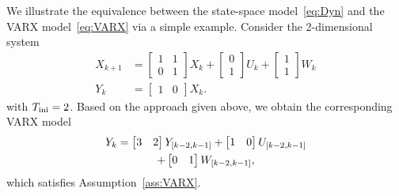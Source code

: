 \begin{exmp}
	We illustrate the equivalence between the state-space model~\eqref{eq:Dyn} and the VARX model~\eqref{eq:VARX} via a simple example. Consider the 2-dimensional system
	\begin{align*}
		X_{k+1} &= \begin{bmatrix} 1 & 1 \\ 0 & 1 \end{bmatrix} X_k+ \begin{bmatrix} 0 \\ 1\end{bmatrix} U_k+ \begin{bmatrix} 1\\1\end{bmatrix}W_k\\
		Y_k & = \begin{bmatrix} 1 & 0\end{bmatrix}X_k.
	\end{align*}
	with $T_\text{ini}=2$. Based on the approach given above, we obtain the corresponding VARX model
	\begin{multline*}
		Y_k = \begin{bmatrix} 3 & 2 \end{bmatrix} Y_{[k-2,k-1]} + \begin{bmatrix} 1 & 0 \end{bmatrix} U_{[k-2,k-1]} \\+ \begin{bmatrix} 0 & 1 \end{bmatrix} W_{[k-2,k-1]},
	\end{multline*}
	which satisfies Assumption~\ref{ass:VARX}.
\end{exmp}

